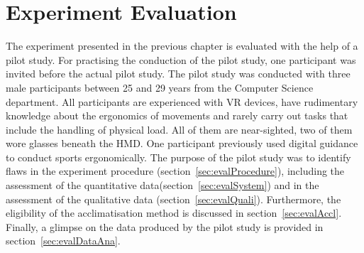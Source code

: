 \chapter{Experiment Evaluation}
\label{chapter:study_evaluation}
The experiment presented in the previous chapter is evaluated with the help of a pilot study. For practising the conduction of the pilot study, one participant was invited before the actual pilot study. The pilot study was conducted with three male participants between 25 and 29 years from the Computer Science department. All participants are experienced with VR devices, have rudimentary knowledge about the ergonomics of movements and rarely carry out tasks that include the handling of physical load. All of them are near-sighted, two of them wore glasses beneath the HMD. One participant previously used digital guidance to conduct sports ergonomically. The purpose of the pilot study was to identify flaws in the experiment procedure (section~\ref{sec:evalProcedure}), \exgo including the assessment of the quantitative data(section~\ref{sec:evalSystem}) and in the assessment of the qualitative data (section~\ref{sec:evalQuali}). Furthermore, the eligibility of the acclimatisation method is discussed in section~\ref{sec:evalAccl}. Finally, a glimpse on the data produced by the pilot study is provided in section~\ref{sec:evalDataAna}.

